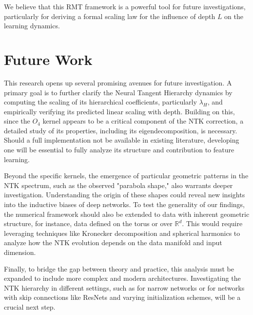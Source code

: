 \documentclass[a4paper]{article}
\begin{document}
We believe that this RMT framework is a powerful tool for future investigations, particularly for deriving a formal scaling law for the influence of depth $L$ on the learning dynamics.


\section{Future Work}
This research opens up several promising avenues for future investigation. A primary goal is to further clarify the Neural Tangent Hierarchy dynamics by computing the scaling of its hierarchical coefficients, particularly $\lambda_H$, and empirically verifying its predicted linear scaling with depth. Building on this, since the $O_4$ kernel appears to be a critical component of the NTK correction, a detailed study of its properties, including its eigendecomposition, is necessary. Should a full implementation not be available in existing literature, developing one will be essential to fully analyze its structure and contribution to feature learning.

Beyond the specific kernels, the emergence of particular geometric patterns in the NTK spectrum, such as the observed "parabola shape," also warrants deeper investigation. Understanding the origin of these shapes could reveal new insights into the inductive biases of deep networks. To test the generality of our findings, the numerical framework should also be extended to data with inherent geometric structure, for instance, data defined on the torus or over $\mathbb{R}^d$. This would require leveraging techniques like Kronecker decomposition and spherical harmonics to analyze how the NTK evolution depends on the data manifold and input dimension.

Finally, to bridge the gap between theory and practice, this analysis must be expanded to include more complex and modern architectures. Investigating the NTK hierarchy in different settings, such as for narrow networks or for networks with skip connections like ResNets and varying initialization schemes, will be a crucial next step.
\end{document}
